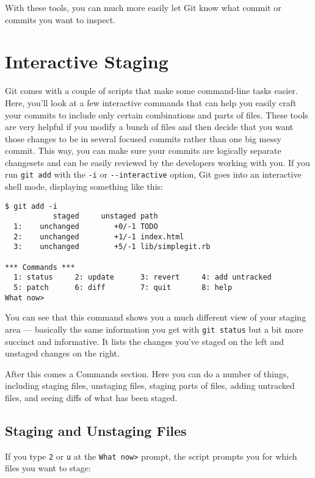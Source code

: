 \documentclass[a4paper]{book}
\begin{document}
With these tools, you can much more easily let Git know what commit or commits you want to inspect.

\section{Interactive Staging}

Git comes with a couple of scripts that make some command-line tasks easier. Here, you'll look at a few interactive commands that can help you easily craft your commits to include only certain combinations and parts of files. These tools are very helpful if you modify a bunch of files and then decide that you want those changes to be in several focused commits rather than one big messy commit. This way, you can make sure your commits are logically separate changesets and can be easily reviewed by the developers working with you. If you run \texttt{git add} with the \texttt{-i} or \texttt{-{}-interactive} option, Git goes into an interactive shell mode, displaying something like this:

\begin{shaded}\begin{verbatim}
$ git add -i
           staged     unstaged path
  1:    unchanged        +0/-1 TODO
  2:    unchanged        +1/-1 index.html
  3:    unchanged        +5/-1 lib/simplegit.rb

*** Commands ***
  1: status     2: update      3: revert     4: add untracked
  5: patch      6: diff        7: quit       8: help
What now>
\end{verbatim}\end{shaded}

You can see that this command shows you a much different view of your staging area --- basically the same information you get with \texttt{git status} but a bit more succinct and informative. It lists the changes you've staged on the left and unstaged changes on the right.

After this comes a Commands section. Here you can do a number of things, including staging files, unstaging files, staging parts of files, adding untracked files, and seeing diffs of what has been staged.

\subsection{Staging and Unstaging Files}

If you type \texttt{2} or \texttt{u} at the \texttt{What now\textgreater{}} prompt, the script prompts you for which files you want to stage:
\end{document}
